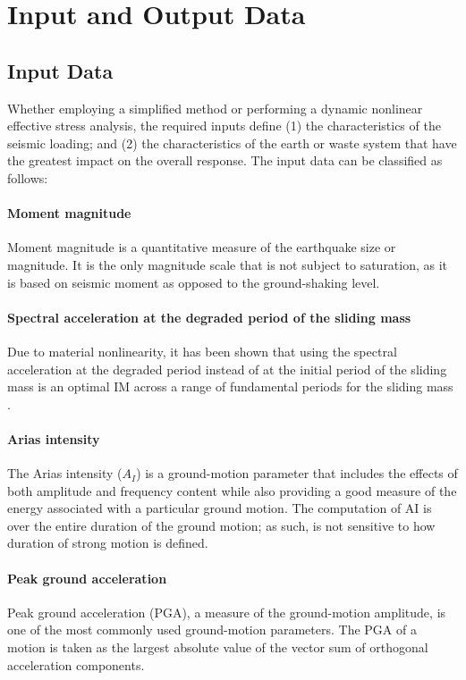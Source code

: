 \section{Input and Output Data}
\label{sec:eq_landslide_input_output}

\subsection{Input Data}
\label{subsec:eq_landslide_input}
Whether employing a simplified method or performing a dynamic nonlinear effective stress analysis, the required inputs define (1) the characteristics of the seismic loading; and (2) the characteristics of the earth or waste system that have the greatest impact on the overall response. The input data can be classified as follows:%

\paragraph{Moment magnitude}
Moment magnitude is a quantitative measure of the earthquake size or magnitude. It is the only magnitude scale that is not subject to saturation, as it is based on seismic moment as opposed to the ground-shaking level.

\paragraph{Spectral acceleration at the degraded period of the sliding mass}
Due to material nonlinearity, it has been shown that using the spectral acceleration at the degraded period instead of at the initial period of the sliding mass is an optimal IM across a range of fundamental periods for the sliding mass \citep{bray2007simplified}.

\paragraph{Arias intensity}
The Arias intensity  ($A_I$) is a ground-motion parameter that includes the effects of both amplitude and frequency content while also providing a good measure of the energy associated with a particular ground motion. The computation of AI is over the entire duration of the ground motion; as such, is not sensitive to how duration of strong motion is defined.

\paragraph{Peak ground acceleration}
Peak ground acceleration (PGA), a measure of the ground-motion amplitude, is one of the most commonly used ground-motion parameters. The PGA of a motion is taken as the largest absolute value of the vector sum of orthogonal acceleration components.


